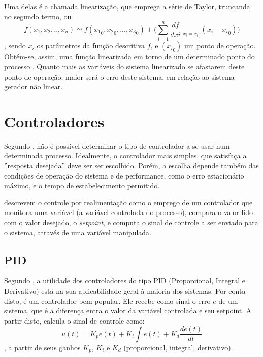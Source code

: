 Uma delas é a chamada linearização, que emprega a série de Taylor, truncanda no segundo termo, ou
\begin{equation}
f(x_1, x_2, .. , x_n) \simeq f({x_1}_0, {x_2}_0, ..., {x_3}_0) + \bigg( \sum_{i=1}^n \frac{df}{dxi}\left.\right|_{x_i = {x_i}_0} ({x_i} - {x_i}_0) \bigg)
\end{equation}
, sendo $x_i$ os parâmetros da função descritiva $f$, e $({x_i}_0)$ um ponto de operação. Obtém-se, assim, uma função linearizada em torno de um determinado ponto do processo . Quanto mais as variáveis do sistema linearizado se afastarem deste ponto de operação, maior será o erro deste sistema, em relação ao sistema gerador não linear.

\section{Controladores}

Segundo , não é possível determinar o tipo de controlador a se usar num determinada processo. Idealmente, o controlador mais simples, que satisfaça a ''resposta desejada'' deve ser ser escolhido. Porém, a escolha depende também das condições de operação do sistema e de performance, como o erro estacionário máximo, e o tempo de estabelecimento permitido.


 descrevem o controle por realimentação como o emprego de um controlador que monitora uma variável (a variável controlada do processo), compara o valor lido com o valor desejado, o \emph{setpoint}, e computa o sinal de controle a ser enviado para o sistema, através de uma variável manipulada.

\subsection{PID}

Segundo , a utilidade dos controladores do tipo PID (Proporcional, Integral e Derivativo) está na sua aplicabilidade geral à maioria dos sistemas. Por conta disto, é um controlador bem popular. Ele recebe como sinal o erro $e$ de um sistema, que é a diferença entra o valor da variável controlada e seu setpoint. A partir disto, calcula o sinal de controle como:
\begin{equation}
u(t) = K_p e(t) + K_i \int e(t) + K_d \frac{de(t)}{dt}
\label{eq_PID}
\end{equation}
, a partir de seus ganhos $K_p$, $K_i$ e $K_d$ (proporcional, integral, derivativo).

